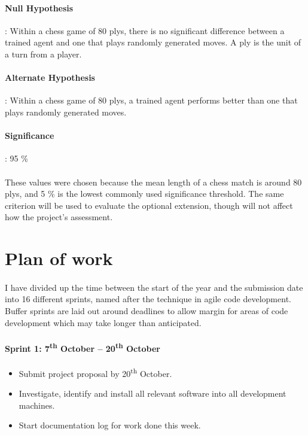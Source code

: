 \documentclass[12pt,a4paper]{book}
\begin{document}
\paragraph{Null Hypothesis}: Within a chess game of 80 plys, there is no significant difference between a trained agent and one that plays randomly generated moves. A ply is the unit of a turn from a player.

\paragraph{Alternate Hypothesis}: Within a chess game of 80 plys, a trained agent performs better than one that plays randomly generated moves.

\paragraph{Significance}: 95 \%

\paragraph{}These values were chosen because the mean length of a chess match is around 80 plys, and 5 \% is the lowest commonly used significance threshold. The same criterion will be used to evaluate the optional extension, though will not affect how the project's assessment.


\section*{Plan of work}

\paragraph{} I have divided up the time between the start of the year and the submission date into 16 different sprints, named after the technique in agile code development. Buffer sprints are laid out around deadlines to allow margin for areas of code development which may take longer than anticipated.

\paragraph{Sprint 1: 7\textsuperscript{th} October -- 20\textsuperscript{th} October}
\begin{itemize}
\item Submit project proposal by 20\textsuperscript{th} October.
\item Investigate, identify and install all relevant software into all development machines.
\item Start documentation log for work done this week.
\end{itemize}
\end{document}
